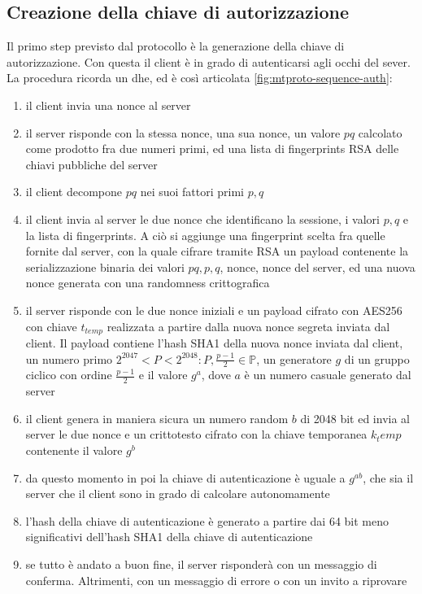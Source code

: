 \subsection{Creazione della chiave di autorizzazione}
Il primo step previsto dal protocollo è la generazione della chiave di autorizzazione.
Con questa il client è in grado di autenticarsi agli occhi del sever. \\
La procedura ricorda un \gls{dhe}, ed è così articolata \autoref{fig:mtproto-sequence-auth}:
\begin{enumerate}
    \item il client invia una nonce al server
    \item il server risponde con la stessa nonce, una sua nonce, un valore $pq$ calcolato come prodotto fra due numeri primi,
          ed una lista di fingerprints RSA delle chiavi pubbliche del server
    \item il client decompone $pq$ nei suoi fattori primi $p, q$
    \item il client invia al server le due nonce che identificano la sessione, i valori $p, q$ e la lista di fingerprints.
          A ciò si aggiunge una fingerprint scelta fra quelle fornite dal server, con la quale cifrare tramite RSA un payload contenente
          la serializzazione binaria dei valori $pq, p, q$, nonce, nonce del server, ed una nuova nonce generata con una randomness crittografica
    \item il server risponde con le due nonce iniziali e un payload cifrato con AES256 con chiave $t_{temp}$ realizzata a partire dalla nuova nonce segreta inviata dal client.
          Il payload contiene l'hash SHA1 della nuova nonce inviata dal client,
          un numero primo $2^{2047} < P < 2^{2048} : P, \frac{p-1}{2} \in \mathbb{P}$, un generatore $g$ di un gruppo ciclico con ordine $\frac{p-1}{2}$ e il valore $g^a$,
          dove $a$ è un numero casuale generato dal server
    \item il client genera in maniera sicura un numero random $b$ di 2048 bit ed invia al server le due nonce e un crittotesto
          cifrato con la chiave temporanea ${k_temp}$ contenente il valore $g^b$
    \item da questo momento in poi la chiave di autenticazione è uguale a $g^{ab}$, che sia il server che il client sono in grado di calcolare autonomamente
    \item l'hash della chiave di autenticazione è generato a partire dai 64 bit meno significativi dell'hash SHA1 della chiave di autenticazione
    \item se tutto è andato a buon fine, il server risponderà con un messaggio di conferma. Altrimenti, con un messaggio di errore o con un invito a riprovare
\end{enumerate}


